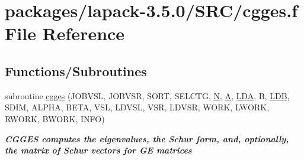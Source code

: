 \hypertarget{cgges_8f}{}\section{packages/lapack-\/3.5.0/\+S\+R\+C/cgges.f File Reference}
\label{cgges_8f}
\subsection*{Functions/\+Subroutines}
\begin{DoxyCompactItemize}
\item 
subroutine \hyperlink{group__complexGEeigen_gaead5d7a4df1e51d7f25d9540acc596e8}{cgges} (J\+O\+B\+V\+S\+L, J\+O\+B\+V\+S\+R, S\+O\+R\+T, S\+E\+L\+C\+T\+G, \hyperlink{polmisc_8c_a0240ac851181b84ac374872dc5434ee4}{N}, \hyperlink{classA}{A}, \hyperlink{example__user_8c_ae946da542ce0db94dced19b2ecefd1aa}{L\+D\+A}, B, \hyperlink{example__user_8c_a50e90a7104df172b5a89a06c47fcca04}{L\+D\+B}, S\+D\+I\+M, A\+L\+P\+H\+A, B\+E\+T\+A, V\+S\+L, L\+D\+V\+S\+L, V\+S\+R, L\+D\+V\+S\+R, W\+O\+R\+K, L\+W\+O\+R\+K, R\+W\+O\+R\+K, B\+W\+O\+R\+K, I\+N\+F\+O)
\begin{DoxyCompactList}\small\item\em {\bfseries  C\+G\+G\+E\+S computes the eigenvalues, the Schur form, and, optionally, the matrix of Schur vectors for G\+E matrices} \end{DoxyCompactList}\end{DoxyCompactItemize}
